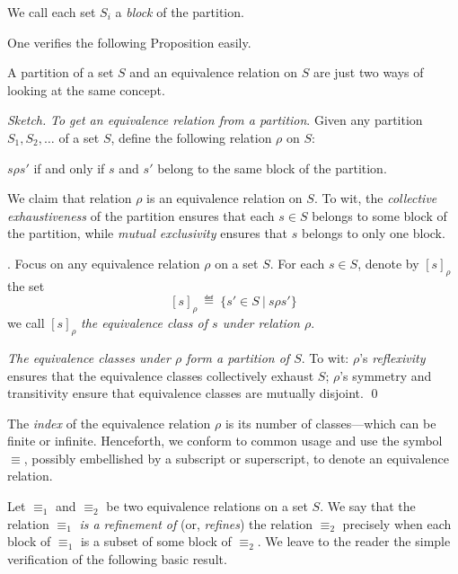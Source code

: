 \smallskip

\noindent
We call each set $S_i$ a {\it block} of the partition. 
 

\noindent
One verifies the following Proposition easily.

\begin{prop}
A partition of a set $S$ and an equivalence relation on $S$ are just
two ways of looking at the same concept.
\end{prop}

\begin{proof}[Sketch]
{\it To get an equivalence relation from a partition}.
Given any partition $S_1, S_2, \ldots$ of a set $S$, define the
following relation $\rho$ on $S$:

$s \rho s'$ if and only if $s$ and $s'$ belong to the same block of the
partition.

\noindent
We claim that relation $\rho$ is an equivalence relation on $S$.  To
wit, the {\em collective exhaustiveness} of the partition ensures that
each $s \in S$ belongs to some block of the partition, while {\em
  mutual exclusivity} ensures that $s$ belongs to only one block.

.
Focus on any equivalence relation $\rho$ on a set
$S$.  For each $s \in S$, denote by $[s]_\rho$ the set
\[ [s]_\rho \ \eqdef \ \{ s' \in S \ | \ s \rho s' \} \]
we call $[s]_\rho$ {\it the equivalence class of $s$ under relation
$\rho$}.

\noindent
{\em The equivalence classes under $\rho$ form a partition of $S$}.
To wit: $\rho$'s {\em reflexivity} ensures that the equivalence classes
collectively exhaust $S$; $\rho$'s symmetry and transitivity ensure that
equivalence classes are mutually disjoint.  \qed
\end{proof}

The {\it index} 
  of the equivalence relation $\rho$ is its number of
classes---which can be finite or infinite.  Henceforth, we conform to
common usage and use the symbol $\equiv$, possibly embellished by a
subscript or superscript, to denote an equivalence relation.

Let $\equiv_1$ and $\equiv_2$ be two equivalence relations on a set
$S$.  We say that the relation $\equiv_1$ {\em is a refinement of}
(or, {\em refines}) 
the relation $\equiv_2$ precisely when each block of $\equiv_1$ is a
subset of some block of $\equiv_2$.  We leave to the reader the simple
verification of the following basic result.


